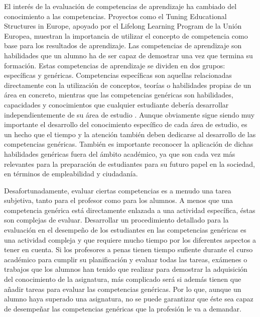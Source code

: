 


El interés de la evaluación de competencias de aprendizaje ha cambiado del conocimiento a las competencias. Proyectos como el Tuning Educational Structures in Europe, apoyado por el Lifelong Learning Program de la Unión Europea, muestran la importancia de utilizar el concepto de competencia como base para los resultados de aprendizaje. Las competencias de aprendizaje son habilidades que un alumno ha de ser capaz de demostrar una vez que termina su formación. Estas competencias de aprendizaje se dividen en dos grupos: específicas y genéricas. Competencias específicas son aquellas relacionadas directamente con la utilización de conceptos, teorías o habilidades propias de un área en concreto, mientras que las competencias genéricas son habilidades, capacidades y conocimientos que cualquier estudiante debería desarrollar independientemente de su área de estudio \cite{Tuning:2003}. Aunque obviamente sigue siendo muy importante el desarrollo del conocimiento específico de cada área de estudio, es un hecho que el tiempo y la atención también deben dedicarse al desarrollo de las competencias genéricas. También es importante reconocer la aplicación de dichas habilidades genéricas fuera del ámbito académico, ya que son cada vez más relevantes para la preparación de estudiantes para su futuro papel en la sociedad, en términos de empleabilidad y ciudadanía.

Desafortunadamente, evaluar ciertas competencias es a menudo una tarea subjetiva, tanto para el profesor como para los alumnos. A menos que una competencia genérica está directamente enlazada a una actividad específica, éstas son complejas de evaluar. Desarrollar un procedimiento detallado para la evaluación en el desempeño de los estudiantes en las competencias genéricas es una actividad compleja y que requiere mucho tiempo por los diferentes aspectos a tener en cuenta. Si los profesores a penas tienen tiempo sufiente durante el curso académico para cumplir su planificación y evaluar todas las tareas, exámenes o trabajos que los alumnos han tenido que realizar para demostrar la adquisición del conocimiento de la asignatura, más complicado será si además tienen que añadir tareas para evaluar las competencias genéricas. Por lo que, aunque un alumno haya superado una asignatura, no se puede garantizar que éste sea capaz de desempeñar las competencias genéricas que la profesión le va a demandar.

